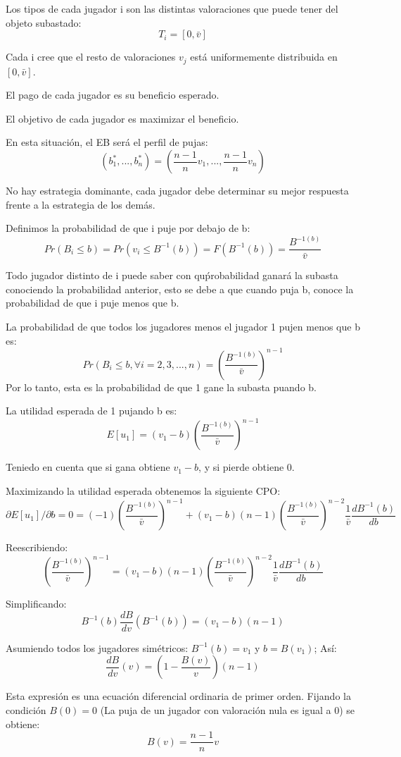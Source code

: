 \documentclass{article}
\theoremstyle{definition}
\theoremstyle{remark}
\begin{document}
Los tipos de cada jugador i son las distintas valoraciones que puede tener del objeto subastado:
$$T_i=[0,\bar{v}]$$

Cada i cree que el resto de valoraciones $v_j$ está uniformemente distribuida en $[0,\bar{v}]$.

El pago de cada jugador es su beneficio esperado.

El objetivo de cada jugador es maximizar el beneficio.

En esta situaci\'on, el EB ser\'a el perfil de pujas:
$${(b_1^*,...,b_n^*)}={(\frac{n-1}{n}v_1,...,\frac{n-1}{n}v_n)}$$

No hay estrategia dominante, cada jugador debe determinar su mejor respuesta frente a la estrategia de los dem\'as.

Definimos la probabilidad de que i puje por debajo de b:
$$Pr(B_i\leq b)=Pr(v_i\leq B^{-1}(b))=F(B^{-1}(b))=\frac{B^{-1(b)}}{\bar{v}}$$

Todo jugador distinto de i puede saber con qu\'probabilidad ganar\'a la subasta conociendo la probabilidad anterior, esto se debe a que cuando puja b, conoce la probabilidad de que i puje menos que b.

La probabilidad de que todos los jugadores menos el jugador 1 pujen menos que b es:
$$Pr(B_i\leq b, \forall i=2,3,...,n)=(\frac{B^{-1(b)}}{\bar{v}})^{n-1}$$
 Por lo tanto, esta es la probabilidad de que 1 gane la subasta puando b.

La utilidad esperada de 1 pujando b es:
$$E[u_1]=(v_1-b)(\frac{B^{-1(b)}}{\bar{v}})^{n-1}$$

Teniedo en cuenta que si gana obtiene $v_1-b$, y si pierde obtiene 0.

Maximizando la utilidad esperada obtenemos la siguiente CPO:
$$\partial E[u_1]/\partial b=0=(-1)(\frac{B^{-1(b)}}{\bar{v}})^{n-1}+(v_1-b)(n-1)(\frac{B^{-1(b)}}{\bar{v}})^{n-2}\frac{1}{\bar{v}}\frac{dB^{-1}(b)}{db}$$

Reescribiendo:
$$(\frac{B^{-1(b)}}{\bar{v}})^{n-1}=(v_1-b)(n-1)(\frac{B^{-1(b)}}{\bar{v}})^{n-2}\frac{1}{\bar{v}}\frac{dB^{-1}(b)}{db}$$

Simplificando:
$$B^{-1}(b)\frac{dB}{dv}(B^{-1}(b))=(v_1-b)(n-1)$$

Asumiendo todos los jugadores sim\'etricos: $B^{-1}(b)=v_1$ y $b=B(v_1)$; As\'i:
$$\frac{dB}{dv}(v)=(1-\frac{B(v)}{v})(n-1)$$

Esta expresi\'on es una ecuaci\'on diferencial ordinaria de primer orden. Fijando la condici\'on $B(0)=0$ (La puja de un jugador con valoraci\'on nula es igual a 0) se obtiene:
$$B(v)=\frac{n-1}{n}v$$
\end{document}
